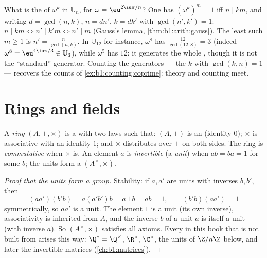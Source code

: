 \begin{example}\label{ex:b1:structures:orderU12}
What is the  of $\omega^k$ in $\mathbb U_n$, for $\omega =
\eu^{2\iu\pi/n}$? One has $(\omega^k)^m = 1$ iff $n \mid km$, and
writing $d = \gcd(n, k)$, $n = dn'$, $k = dk'$ with $\gcd(n', k')
= 1$: $n \mid km \iff n' \mid k'm \iff n' \mid m$ (Gauss's
lemma, \cref{thm:b1:arith:gauss}). The least such $m \geq 1$ is
$n' = \frac{n}{\gcd(n,k)}$. In $\mathbb U_{12}$ for instance,
$\omega^8$ has  $\frac{12}{\gcd(12,8)} = 3$ (indeed
$\omega^8 = \eu^{4\iu\pi/3} \in \mathbb U_3$), while $\omega^5$
has  $12$: it generates the whole , though it is not
the ``standard'' generator. Counting the generators --- the $k$
with $\gcd(k, n) = 1$ --- recovers the  counts of
\cref{ex:b1:counting:coprime}:  theory and counting meet.
\end{example}

\section{Rings and fields}

\begin{definition}[Ring]\label{def:b1:structures:ring}
A \emph{ring} $(A, +, \times)$ is a  with two laws such
that: $(A, +)$ is an  (identity $0$); $\times$ is
associative with an identity $1$; and $\times$ distributes over $+$ on
both sides. The ring is \emph{commutative} when $\times$ is. An
element $a$ is \emph{invertible} (a \emph{unit}) when $ab = ba = 1$
for some $b$; the units form a  $(A^\times, \times)$.
\end{definition}

\begin{proof}[Proof that the units form a group]
Stability: if $a, a'$ are units with inverses $b, b'$, then
\[
(aa')(b'b) = a(a'b')b = a\,1\,b = ab = 1,
\qquad (b'b)(aa') = 1
\]
symmetrically, so $aa'$ is a unit. The element $1$ is a unit (its
own inverse), associativity is inherited from $A$, and the
inverse $b$ of a unit $a$ is itself a unit (with inverse $a$).
So $(A^\times, \times)$ satisfies all  axioms. Every 
in this book that is not built from  arises this way:
$\Q^* = \Q^\times$, $\R^*$, $\C^*$, the units of $\Z/n\Z$ below,
and later the invertible matrices (\cref{ch:b1:matrices}).
\end{proof}

